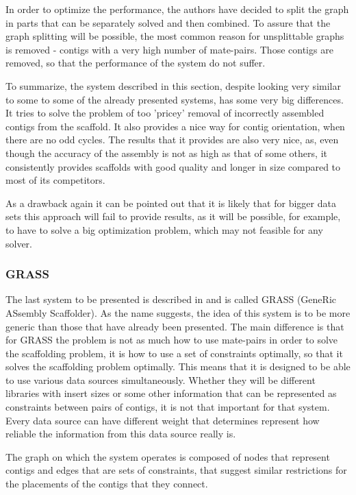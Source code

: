 \documentclass[11pt]{article}
\begin{document}
In order to optimize the performance, the authors have decided to split the
graph in parts that can be separately solved and then combined. To assure that
the graph splitting will be possible, the most common reason for unsplittable
graphs is removed - contigs with a very high number of mate-pairs. Those contigs
are removed, so that the performance of the system do not suffer.

To summarize, the system described in this section, despite looking very similar
to some to some of the already presented systems, has some very big differences.
It tries to solve the problem of too 'pricey' removal of incorrectly assembled
contigs from the scaffold. It also provides a nice way for contig orientation,
when there are no odd cycles. The results that it provides are also very nice,
as, even though the accuracy of the assembly is not as high as that of some
others, it consistently provides scaffolds with good quality and longer in size
compared to most of its competitors.

As a drawback again it can be pointed out that it is likely that for bigger data
sets this approach will fail to provide results, as it will be possible, for
example, to have to solve a big optimization problem, which may not feasible for
any solver. 

\subsubsection{GRASS} %
\label{ssub:GRASS}
The last system to be presented is described in \cite{grass} and is called
GRASS (GeneRic ASsembly Scaffolder). As the name suggests, the idea of this
system is to be more generic than those that have already been presented. The
main difference is that for GRASS the problem is not as much how to use
mate-pairs in order to solve the scaffolding problem, it is how to use a set of
constraints optimally, so that it solves the scaffolding problem optimally. This
means that it is designed to be able to use various data sources simultaneously.
Whether they will be different libraries with insert sizes or some other
information that can be represented as constraints between pairs of contigs, it
is not that important for that system. Every data source can have different
weight that determines represent how reliable the information from this data
source really is.

The graph on which the system operates is composed of nodes that represent
contigs and edges that are sets of constraints, that suggest similar
restrictions for the placements of the contigs that they connect. 
\end{document}
